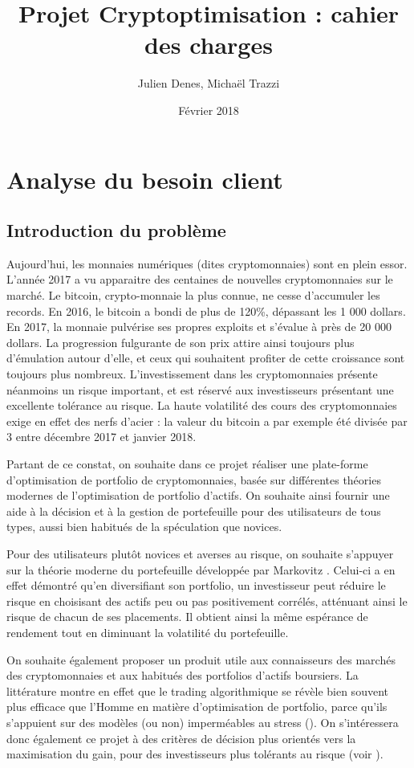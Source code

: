 \documentclass[a4paper]{article}
\title{Projet Cryptoptimisation : cahier des charges}
\author[]{Julien Denes, Michaël Trazzi}
\affil[]{Faculté des Sciences et Ingénierie -- Sorbonne Université}
\date{Février 2018}
\begin{document}
\maketitle

\section{Analyse du besoin client}

\subsection{Introduction du problème}

Aujourd’hui, les monnaies numériques (dites cryptomonnaies) sont en plein essor. L'année 2017 a vu apparaitre des centaines de nouvelles cryptomonnaies sur le marché. Le bitcoin, crypto-monnaie la plus connue, ne cesse d’accumuler les records. En 2016, le bitcoin a bondi de plus de 120\%, dépassant les 1 000 dollars. En 2017, la monnaie pulvérise ses propres exploits et s'évalue à près de 20 000 dollars. La progression fulgurante de son prix attire ainsi toujours plus d'émulation autour d'elle, et ceux qui souhaitent profiter de cette croissance sont toujours plus nombreux. L’investissement dans les cryptomonnaies présente néanmoins un risque important, et est réservé aux investisseurs présentant une excellente tolérance au risque. La haute volatilité des cours des cryptomonnaies exige en effet des nerfs d’acier : la valeur du bitcoin a par exemple été divisée par 3 entre décembre 2017 et janvier 2018.

Partant de ce constat, on souhaite dans ce projet réaliser une plate-forme d’optimisation de portfolio de cryptomonnaies, basée sur différentes théories modernes de l'optimisation de portfolio d'actifs. On souhaite ainsi fournir une aide à la décision et à la gestion de portefeuille pour des utilisateurs de tous types, aussi bien habitués de la spéculation que novices.

Pour des utilisateurs plutôt novices et averses au risque, on souhaite s'appuyer sur la théorie moderne du portefeuille développée par Markovitz \cite{Markovitz1952}. Celui-ci a en effet démontré qu'en diversifiant son portfolio, un investisseur peut réduire le risque en choisisant des actifs peu ou pas positivement corrélés, atténuant ainsi le risque de chacun de ses placements. Il obtient ainsi la même espérance de rendement tout en diminuant la volatilité du portefeuille.

On souhaite également proposer un produit utile aux connaisseurs des marchés des cryptomonnaies et aux habitués des portfolios d'actifs boursiers. La littérature montre en effet que le trading algorithmique se révèle bien souvent plus efficace que l'Homme en matière d'optimisation de portfolio, parce qu'ils s'appuient sur des modèles (ou non) imperméables au stress (\cite{Chaboud2014}). On s'intéressera donc également ce projet à des critères de décision plus orientés vers la maximisation du gain, pour des investisseurs plus tolérants au risque (voir \cite{Li2014}).
\end{document}
